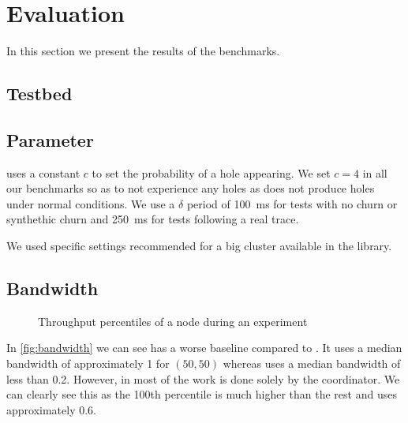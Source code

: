 
\section{Evaluation}
\label{sec:evaluation}
\tableaverage
{}\tableglobaltime
{}\tablelocaldeltas
{}\tablelocaltime
In this section we present the results of the benchmarks.
\subsection{Testbed}
\subsection{Parameter}
\epto uses a constant $c$ to set the probability of a hole appearing. We set $c = 4$ in all our benchmarks so as to not experience any holes as \jgroups does not produce holes under normal conditions. We use a $\delta$ period of \SI{100}{\milli\second} for tests with no churn or synthethic churn and \SI{250}{\milli\second} for tests following a real trace.
\par 
We used specific settings recommended for a big cluster available in the \jgroups library.
\subsection{Bandwidth}

\begin{figure}[htp]
	\centering
	
	\vspace{-2mm} 
	\caption{Throughput percentiles of a node during an experiment}
	\vspace{-2mm} 
	\label{fig:bandwidth}
\end{figure}
In \autoref{fig:bandwidth} we can see \epto has a worse baseline compared to \jgroups. It uses a median bandwidth of approximately \SI{1}{\mbps} for $(50,50)$ whereas \jgroups uses a median bandwidth of less than \SI{0.2}{\mbps}. However, in \jgroups most of the work is done solely by the coordinator. We can clearly see this as the 100th percentile is much higher than the rest and uses approximately \SI{.6}{\mbps}.

